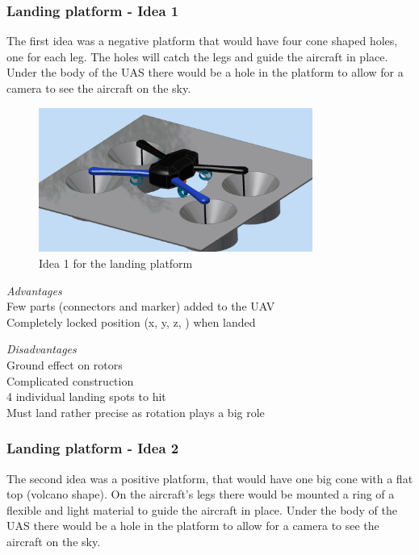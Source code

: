 \subsubsection{Landing platform - Idea 1}
The first idea was a negative platform that would have four cone shaped holes, one for each leg. The holes will catch the legs and guide the aircraft in place. Under the body of the UAS there would be a hole in the platform to allow for a camera to see the aircraft on the sky.
\begin{figure}
	\centering
	\includegraphics[width=0.8\textwidth]{imgs/mockup_idea_2}
	\caption{Idea 1 for the landing platform}
\end{figure}
\begin{center}
	\begin{minipage}[t]{0.45\textwidth}
		\begin{flushleft}
			\emph{Advantages}\\
			Few parts (connectors and marker) added to the UAV\\
			Completely locked position (x, y, z, \texttheta ) when landed
		\end{flushleft}
	\end{minipage}
	\begin{minipage}[t]{0.45\textwidth}
		\begin{flushleft}
			\emph{Disadvantages}\\
			Ground effect on rotors\\
			Complicated construction \\
			4 individual landing spots to hit\\
			Must land rather precise as rotation plays a big role
		\end{flushleft}
	\end{minipage}
\end{center}

\subsubsection{Landing platform - Idea 2}
The second idea was a positive platform, that would have one big cone with a flat top (volcano shape). On the aircraft's legs there would be mounted a ring of a flexible and light material to guide the aircraft in place. Under the body of the UAS there would be a hole in the platform to allow for a camera to see the aircraft on the sky.

